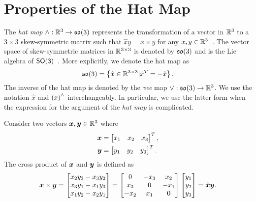 
\chapter{Properties of the Hat Map}


The \textit{hat map} $\wedge :\mathbb{R}^{3}\rightarrow\mathfrak{so}(3)$ represents the transformation of a vector in $\mathbb{R}^{3}$ to a $3\times 3$ skew-symmetric matrix such that $\hat x y = x\times y$ for any $x,y\in\mathbb{R}^{3}$~\cite{bullo2004}. 
The vector space of skew-symmetric matrices in \( \mathbb{R}^{3 \times 3 } \) is denoted by \( \mathfrak{so}(3) \) and is the Lie algebra of \( \mathsf{SO(3)} \)~\cite{hall2015}.
More explicitly, we denote the hat map as
\begin{align*}
    \mathfrak{so}(3) = \left\{  \hat x \in \mathbb{R}^{3 \times 3} | \hat x^T = - \hat x  \right\}.
\end{align*}
The inverse of the hat map is denoted by the \textit{vee} map $\vee:\mathfrak{so}(3)\rightarrow\mathbb{R}^{3}$. 
We use the notation \( \hat{x}\) and \( \left( x \right)^\wedge\) interchangeably.
In particular, we use the latter form when the expression for the argument of the \textit{hat map} is complicated. 

Consider two vectors \( \bm{x}, \bm{y} \in \mathbb{R}^3\) where
\begin{align*}
    \bm{x} &= \begin{bmatrix} x_1 & x_2 & x_3 \end{bmatrix}^T , \\
    \bm{y} &= \begin{bmatrix} y_1 & y_2 & y_3 \end{bmatrix}^T .
\end{align*}
The cross product of \( \bm{x} \) and \( \bm{y} \) is defined as
\begin{align}
    \bm{x} \times \bm{y} = 
    \begin{bmatrix} 
        x_2 y_3 - x_3 y_2 \\
        x_3 y_1 - x_1 y_3 \\
        x_1 y_2 - x_2 y_1 
    \end{bmatrix}
    = 
    \begin{bmatrix} 0 & -x_3 & x_2 \\ x_3 & 0 & -x_1 \\ -x_2 & x_1 & 0\end{bmatrix}
    \begin{bmatrix} y_1 \\ y_2 \\ y_3 \end{bmatrix}
    = \hat{\bm{x}} \bm{y}.
\end{align}

